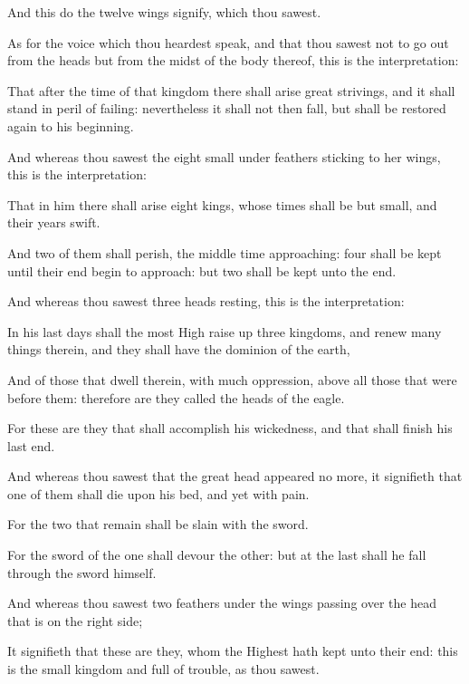 {\par }{\PP {}And this do the twelve wings signify, which thou sawest.
\par }{\PP {}As for the voice which thou heardest speak, and that thou sawest not to go out from the heads but from the midst of the body thereof, this is the interpretation:
\par }{\PP {}That after the time of that kingdom there shall arise great strivings, and it shall stand in peril of failing: nevertheless it shall not then fall, but shall be restored again to his beginning.
\par }{\PP {}And whereas thou sawest the eight small under feathers sticking to her wings, this is the interpretation:
\par }{\PP {}That in him there shall arise eight kings, whose times shall be but small, and their years swift.
\par }{\PP {}And two of them shall perish, the middle time approaching: four shall be kept until their end begin to approach: but two shall be kept unto the end.
\par }{\PP {}And whereas thou sawest three heads resting, this is the interpretation:
\par }{\PP {}In his last days shall the most High raise up three kingdoms, and renew many things therein, and they shall have the dominion of the earth,
\par }{\PP {}And of those that dwell therein, with much oppression, above all those that were before them: therefore are they called the heads of the eagle.
\par }{\PP {}For these are they that shall accomplish his wickedness, and that shall finish his last end.
\par }{\PP {}And whereas thou sawest that the great head appeared no more, it signifieth that one of them shall die upon his bed, and yet with pain.
\par }{\PP {}For the two that remain shall be slain with the sword.
\par }{\PP {}For the sword of the one shall devour the other: but at the last shall he fall through the sword himself.
\par }{\PP {}And whereas thou sawest two feathers under the wings passing over the head that is on the right side;
\par }{\PP {}It signifieth that these are they, whom the Highest hath kept unto their end: this is the small kingdom and full of trouble, as thou sawest.
}

